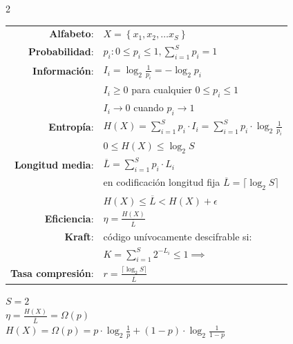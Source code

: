 \documentclass[10pt,a4paper]{article}
\begin{document}
\begin{multicols}{2}
    \begin{tcolorbox}[title=Características fuente]
        \begin{tabular}{rl}
            \textbf{Alfabeto}:     & $X = \left\{ x_1, x_2, \ldots x_S \right\}$ \\
            \textbf{Probabilidad}: & $p_i : 0 \leq p_i \leq 1, \sum_{i=1}^{S}{p_i} = 1$ \\
            \textbf{Información}:  & $I_i = \log_2{\frac{1}{p_i}} = -\log_2{p_i}$ \\
                        & $I_i \geq 0$ para cualquier $0 \leq p_i \leq 1$ \\
                        & $I_i \to 0$ cuando $p_i \to 1$ \\
            \textbf{Entropía}:     & $H(X) = \sum_{i=1}^{S}{p_i \cdot I_i} = \sum_{i=1}^{S}{p_i \cdot \log_2{\frac{1}{p_i}}}$ \\
                        & $0 \leq H(X) \leq \log_2{S}$ \\
        \textbf{Longitud media}: & $\overline{L} = \sum_{i=1}^{S}{p_i \cdot L_i}$ \\
                        & en codificación longitud fija $\overline{L} = \lceil\log_2{S}\rceil$ \\
                        & $H(X) \leq \overline{L} < H(X) + \epsilon$ \\
            \textbf{Eficiencia}:   & $\eta = \frac{H(X)}{\overline{L}}$ \\
            \textbf{Kraft}: & código unívocamente descifrable si: \\
                            & $K = \sum\limits_{i=1}^{S}{2^{-L_i}} \leq 1 \implies$ \\
            \textbf{Tasa compresión}: & $r = \frac{\lceil \log_2{S} \rceil}{\overline{L}}$
        \end{tabular}
    \end{tcolorbox}
    \begin{tcolorbox}[title=Entropía binaria]
        $S = 2$ \\
        $\eta = \frac{H(X)}{\overline{L}} = \Omega\left(p\right)$ \\
        $H(X) = \Omega\left(p\right) = p\cdot\log_2{\frac{1}{p}} + (1-p)\cdot\log_2\frac{1}{1-p}$ \\
    \end{tcolorbox}
\end{multicols}
\end{document}
